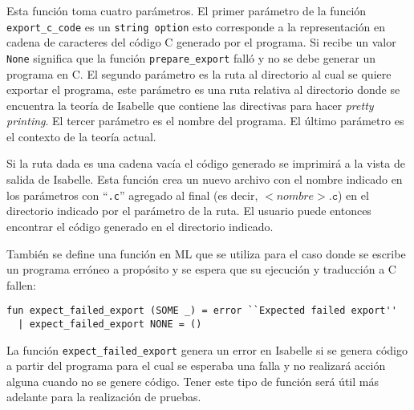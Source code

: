 \begin{comment}
\begin{lstlisting}
  fun export_c_code (SOME code) rel_path name thy =
    let
      val str = code |> String.implode;
    in
      if rel_path="" orelse name="" then
        (writeln str; thy)
      else let
        val base_path = Resources.master_directory thy
        val rel_path = Path.explode rel_path
        val name_path = Path.basic name |> Path.ext "c"

        val abs_path = Path.appends [base_path, rel_path, name_path]
        val abs_path = Path.implode abs_path

        val _ = writeln ("Writing to file " ^ abs_path)

        val os = TextIO.openOut abs_path;
        val _ = TextIO.output (os, str);
        val _ = TextIO.flushOut os;
        val _ = TextIO.closeOut os;
        in thy end
      end
  | export_c_code NONE _ _ thy =
      (error "Invalid program, no code is generated."; thy)
\end{lstlisting}
\end{comment}

Esta función toma cuatro parámetros.
El primer parámetro de la función \verb|export_c_code| es un \verb|string option| esto corresponde a la representación en cadena de caracteres del código C generado por el programa.
Si recibe un valor \verb|None| significa que la función \verb|prepare_export| falló y no se debe generar un programa en C.
El segundo parámetro es la ruta al directorio al cual se quiere exportar el programa, este parámetro es una ruta relativa al directorio donde se encuentra la teoría de Isabelle que contiene las directivas para hacer \textit{pretty printing}.
El tercer parámetro es el nombre del programa.
El último parámetro es el contexto de la teoría actual.

Si la ruta dada es una cadena vacía el código generado se imprimirá a la vista de salida de Isabelle.
Esta función crea un nuevo archivo con el nombre indicado en los parámetros con ``\verb|.c|'' agregado al final (es decir, $<nombre>\mathtt{.c}$) en el directorio indicado por el parámetro de la ruta.
El usuario puede entonces encontrar el código generado en el directorio indicado.

También se define una función en ML que se utiliza para el caso donde se escribe un programa erróneo a propósito y se espera que su ejecución y traducción a C fallen:

\begin{lstlisting}
fun expect_failed_export (SOME _) = error ``Expected failed export''
  | expect_failed_export NONE = ()
\end{lstlisting}

La función \verb|expect_failed_export| genera un error en Isabelle si se genera código a partir del programa para el cual se esperaba una falla y no realizará acción alguna cuando no se genere código.
Tener este tipo de función será útil más adelante para la realización de pruebas.
